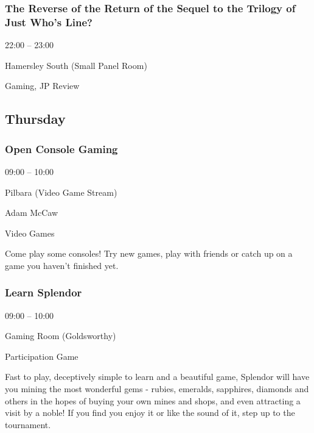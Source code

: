 \documentclass{scrreprt}
\begin{document}
\begin{multicols}{2}
\subsubsection*{The Reverse of the Return of the Sequel to the Trilogy of Just Who's Line?}\begin{description}
\setlength{\itemsep}{0pt}
\setlength{\parsep}{0pt}
\setlength{\parskip}{0pt}
\item[Time:]{22:00 -- 23:00}
\item[Venue:]{Hamersley South (Small Panel Room)}
\item[Tags:]{Gaming, JP Review}\end{description}

\subsection*{Thursday}\subsubsection*{Open Console Gaming}\begin{description}
\setlength{\itemsep}{0pt}
\setlength{\parsep}{0pt}
\setlength{\parskip}{0pt}
\item[Time:]{09:00 -- 10:00}
\item[Venue:]{Pilbara (Video Game Stream)}
\item[People:]{Adam McCaw}
\item[Tags:]{Video Games}\end{description}
Come play some consoles! Try new games, play with friends or catch up on a game you haven't finished yet.
\subsubsection*{Learn Splendor}\begin{description}
\setlength{\itemsep}{0pt}
\setlength{\parsep}{0pt}
\setlength{\parskip}{0pt}
\item[Time:]{09:00 -- 10:00}
\item[Venue:]{Gaming Room (Goldsworthy)}
\item[Tags:]{Participation Game}\end{description}
Fast to play, deceptively simple to learn and a beautiful game, Splendor will have you mining the most wonderful gems - rubies, emeralds, sapphires, diamonds and others in the hopes of buying your own mines and shops, and even attracting a visit by a noble! If you find you enjoy it or like the sound of it, step up to the tournament.

\end{multicols}
\end{document}
